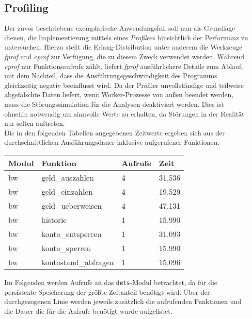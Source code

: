 \subsection{Profiling}
Der zuvor beschriebene exemplarische Anwendungsfall soll nun als Grundlage dienen, die Implementierung mittels eines \textit{Profilers} hinsichtlich der Performanz zu untersuchen. Hierzu stellt die Erlang-Distribution unter anderem die Werkzeuge \textit{fprof} und \textit{cprof} zur Verfügung, die zu diesem Zweck verwendet werden. Während \textit{cprof} nur Funktionsaufrufe zählt, liefert \textit{fprof} ausführlichere Details zum Ablauf, mit dem Nachteil, dass die Ausführungsgeschwindigkeit des Programms gleichzeitig negativ beeinflusst wird. Da der Profiler unvollständige und teilweise abgefälschte Daten liefert, wenn Worker-Prozesse von außen beendet werden, muss die Störungssimulation für die Analysen deaktiviert werden. Dies ist ohnehin notwendig um sinnvolle Werte zu erhalten, da Störungen in der Realität nur selten auftreten.\\
Die in den folgenden Tabellen angegebenen Zeitwerte ergeben sich aus der durchschnittlichen Ausführungsdauer inklusive aufgerufener Funktionen.

\begin{center}
	\begin{tabular}{p{1.2cm}|p{5cm}|p{2cm}|p{2cm}}
		Modul & Funktion & Aufrufe & Zeit \\
		\hline
		\hline
		bw & geld\_auszahlen & 4 & 31,536 \\
		bw & geld\_einzahlen & 4 & 19,529 \\
		bw & geld\_ueberweisen & 4 & 47,131 \\
		bw & historie & 1 & 15,990 \\
		bw & konto\_entsperren & 1 & 31,093 \\
		bw & konto\_sperren & 1 & 15,990 \\
		bw & kontostand\_abfragen & 1 & 15,096 \\
	\end{tabular}
\end{center}

Im Folgenden werden Aufrufe an das \texttt{dets}-Modul betrachtet, da für die persistente Speicherung der größte Zeitanteil benötigt wird. Über der durchgezogenen Linie werden jeweils zusätzlich die aufrufenden Funktionen und die Dauer die für die Aufrufe benötigt wurde aufgelistet.

